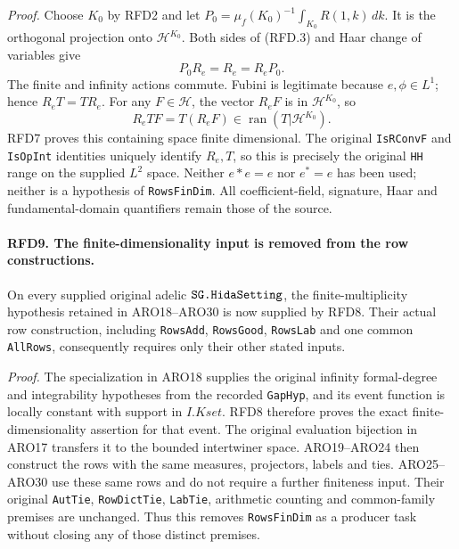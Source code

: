 \documentclass[11pt,a4paper]{article}
\numberwithin{equation}{section}
\theoremstyle{remark}\newtheorem{remark}[theorem]{Remark}
\begin{document}
\emph{Proof.}
Choose \(K_0\) by RFD2 and let
\(P_0=\mu_f(K_0)^{-1}\int_{K_0}R(1,k)\,dk\).
It is the orthogonal projection onto \(\mathcal H^{K_0}\).
Both sides of (RFD.3) and Haar change of variables give
\[
                 P_0R_e=R_e=R_eP_0.
 \tag{RFD.13}
\]
The finite and infinity actions commute.  Fubini is legitimate
because \(e,\phi\in L^1\); hence \(R_eT=TR_e\).
For any \(F\in\mathcal H\), the vector \(R_eF\) is in
\(\mathcal H^{K_0}\), so
\[
 R_eTF=T(R_eF)\in\operatorname{ran}(T|\mathcal H^{K_0}).
\]
RFD7 proves this containing space finite dimensional.  The
original \texttt{Is\allowbreak RConv\allowbreak F} and \texttt{Is\allowbreak Op\allowbreak Int} identities
uniquely identify \(R_e,T\), so this is precisely the original
\texttt{HH} range on the supplied \(L^2\) space.  Neither
\(e*e=e\) nor \(e^*=e\) has been used; neither is a hypothesis
of \texttt{Rows\allowbreak Fin\allowbreak Dim}.  All coefficient-field, signature, Haar
and fundamental-domain quantifiers remain those of the source.

\paragraph{RFD9. The finite-dimensionality input is removed from the row constructions.}
\label{claim:RFD9}
On every supplied original adelic \(\texttt{SG.\allowbreak Hida\allowbreak Setting}\),
the finite-multiplicity hypothesis retained in ARO18--ARO30 is
now supplied by RFD8.  Their actual row construction, including
\texttt{Rows\allowbreak Add}, \texttt{Rows\allowbreak Good}, \texttt{Rows\allowbreak Lab} and one
common \texttt{All\allowbreak Rows}, consequently requires only their other
stated inputs.

\emph{Proof.}
The specialization in ARO18 supplies the original infinity
formal-degree and integrability hypotheses from the recorded
\texttt{Gap\allowbreak Hyp}, and its event function is locally constant
with support in \(I.Kset\).  RFD8 therefore proves the exact
finite-dimensionality assertion for that event.  The original
evaluation bijection in ARO17 transfers it to the bounded
intertwiner space.  ARO19--ARO24 then construct the rows with
the same measures, projectors, labels and ties.  ARO25--ARO30
use these same rows and do not require a further finiteness
input.  Their original \texttt{Aut\allowbreak Tie}, \texttt{Row\allowbreak Dict\allowbreak Tie},
\texttt{Lab\allowbreak Tie}, arithmetic counting and common-family premises
are unchanged.  Thus this removes \texttt{Rows\allowbreak Fin\allowbreak Dim} as a
producer task without closing any of those distinct premises.
\end{document}
